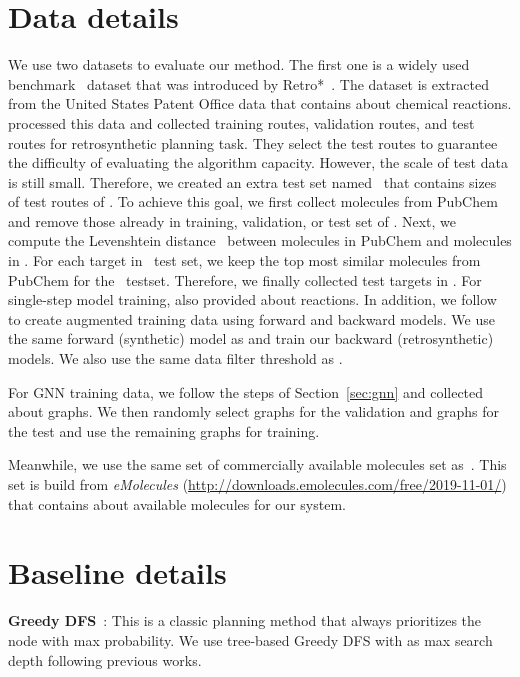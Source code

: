 \documentclass[sigconf]{acmart}
\begin{document}
\section{Data details}
We use two datasets to evaluate our method. The first one is a widely used benchmark \uspto~dataset that was introduced by Retro*~\citep{Chen2020}. The dataset is extracted from the United States Patent Office data that contains about  chemical reactions.
\citet{Chen2020} processed this data and collected  training routes,  validation routes, and  test routes for retrosynthetic planning task.
They select the  test routes to guarantee the difficulty of evaluating the algorithm capacity.
However, the scale of test data is still small.
Therefore, we created an extra test set named \usptoext~that contains  sizes of test routes of \uspto.
To achieve this goal, we first collect  molecules from PubChem~\citep{pubchem} and remove those already in training, validation, or test set of \uspto.
Next, we compute the Levenshtein distance~\citep{levenshtein1966binary} between molecules in PubChem and molecules in \uspto.
For each target in \uspto~test set, we keep the top  most similar molecules from PubChem for the \usptoext~testset.
Therefore, we finally collected  test targets in \usptoext.
For single-step model training, \citet{Chen2020} also provided about  reactions.
In addition, we follow \citep{Kim2021} to create augmented training data using forward and backward models.
We use the same forward (synthetic) model as \citet{Kim2021} and train our backward (retrosynthetic) models. 
We also use the same data filter threshold  as \citet{Kim2021}.

For GNN training data, we follow the steps of Section~\ref{sec:gnn} and collected about  graphs.
We then randomly select  graphs for the validation and  graphs for the test and use the remaining graphs for training.

Meanwhile, we use the same set of commercially available molecules set  as~\cite{Chen2020,Kim2021}.
This set is build from \textit{eMolecules} (\url{http://downloads.emolecules.com/free/2019-11-01/}) that contains about  available molecules for our system.

\section{Baseline details}
 \textbf{Greedy DFS}~\citep{Hong2021}: This is a classic planning method that always prioritizes the node with max probability. We use tree-based Greedy DFS with  as max search depth following previous works.
\end{document}
